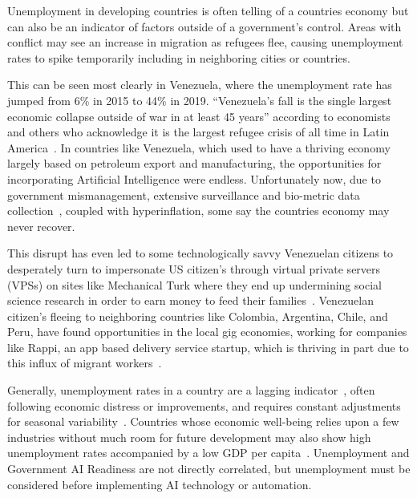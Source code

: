 \documentclass[conference]{IEEEtran}
\begin{document}
Unemployment in developing countries is often telling of a countries economy but can also be an indicator of factors outside of a government's control. Areas with conflict may see an increase in migration as refugees flee, causing unemployment rates to spike temporarily including in neighboring cities or countries.

This can be seen most clearly in Venezuela, where the unemployment rate has jumped from 6\% in 2015 to 44\% in 2019. ``Venezuela's fall is the single largest economic collapse outside of war in at least 45 years'' according to economists and others who acknowledge it is the largest refugee crisis of all time in Latin America~\cite{kurmanaev2019venezuela}. In countries like Venezuela, which used to have a thriving economy largely based on petroleum export and manufacturing, the opportunities for incorporating Artificial Intelligence were endless. Unfortunately now, due to government mismanagement, extensive surveillance and bio-metric data collection~\cite{berwick2018how}, coupled with hyperinflation, some say the countries economy may never recover.

This disrupt has even led to some technologically savvy Venezuelan citizens to desperately turn to impersonate US citizen's through virtual private servers (VPSs) on sites like Mechanical Turk where they end up undermining social science research in order to earn money to feed their families~\cite{kennedy2018venezuela}. Venezuelan citizen's fleeing to neighboring countries like Colombia, Argentina, Chile, and Peru, have found opportunities in the local gig economies, working for companies like Rappi, an app based delivery service startup, which is thriving in part due to this influx of migrant workers~\cite{wyss2019how}. 

Generally, unemployment rates in a country are a lagging indicator~\cite{cain1979unemployment}, often following economic distress or improvements, and requires constant adjustments for seasonal variability~\cite{haynes1996unemployment}. Countries whose economic well-being relies upon a few industries without much room for future development may also show high unemployment rates accompanied by a low GDP per capita~\cite{frenkel2006unemployment}. Unemployment and Government AI Readiness are not directly correlated, but unemployment must be considered before implementing AI technology or automation.
\end{document}
